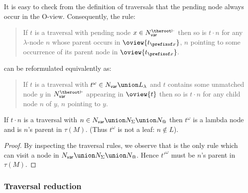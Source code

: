 \begin{remark}
\label{rem:inputvar_bis}
It is easy to check from the definition of traversals that the pending node always occur in the O-view. Consequently, the rule:
\begin{quote}
 If $t$ is a traversal with pending node  $x \in N_{\sf var}^{\theroot\vdash}$ then so is $t \cdot n$ for any $\lambda$-node $n$ whose parent occurs in  $\oview{t_{\prefixof x}}$, $n$ pointing to some occurrence of its  parent node in $\oview{t_{\prefixof x}}$.
\end{quote}
\noindent can be reformulated equivalently as:
\begin{quote}
 If $t$ is a traversal with
$t^\omega \in N_{\sf var}\union L_\lambda$ and $t$ contains some unmatched node $y$ in $N_{\sf var}^{\theroot\vdash}$ appearing in $\oview{t}$ then so is $t \cdot n$ for any child node $n$ of $y$, $n$ pointing to $y$.
\end{quote}
\end{remark}

\begin{lemma}
\label{lem:trav_last_not_leaf} If $t \cdot n $ is a traversal with
$n \in N_{\sf var} \union N_\Sigma \union N_@$ then $t^\omega$ is a
lambda node and is $n$'s parent in $\tau(M)$. (Thus $t^\omega$ is
not a leaf: $n\not\in L$).
\end{lemma}
\begin{proof}
By inspecting the traversal rules, we observe that 
is the only rule  which can visit a node in $N_{\sf var} \union
N_\Sigma \union N_@$. Hence $t'^\omega$ must be $n$'s parent in
$\tau(M)$.
\end{proof}

\subsubsection{Traversal reduction}



